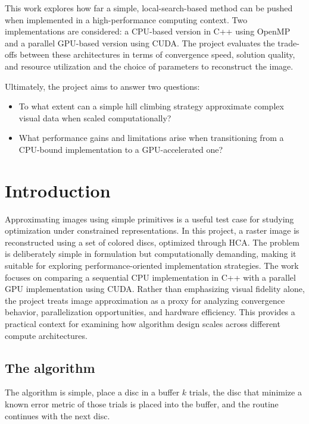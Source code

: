 This work explores how far a simple, local-search-based method can be pushed when implemented in a high-performance computing context. Two implementations are considered: a CPU-based version in C++ using OpenMP and a parallel GPU-based version using CUDA. The project evaluates the trade-offs between these architectures in terms of convergence speed, solution quality, and resource utilization and the choice of parameters to reconstruct the image.


Ultimately, the project aims to answer two questions:

\begin{itemize}
\item To what extent can a simple hill climbing strategy approximate complex visual data when scaled computationally?
\item What performance gains and limitations arise when transitioning from a CPU-bound implementation to a GPU-accelerated one?
\end{itemize}


\pagestyle{fancy}

\section{Introduction}

Approximating images using simple primitives is a useful test case for studying optimization under constrained representations. In this project, a raster image is reconstructed using a set of colored discs, optimized through HCA. The problem is deliberately simple in formulation but computationally demanding, making it suitable for exploring performance-oriented implementation strategies.
The work focuses on comparing a sequential CPU implementation in C++ with a parallel GPU implementation using CUDA. Rather than emphasizing visual fidelity alone, the project treats image approximation as a proxy for analyzing convergence behavior, parallelization opportunities, and hardware efficiency. This provides a practical context for examining how algorithm design scales across different compute architectures.

\subsection{The algorithm}

The algorithm is simple, place a disc in a buffer $k$ trials, the disc that minimize a known error metric of those trials is placed into the buffer, and the routine continues with the next disc.


